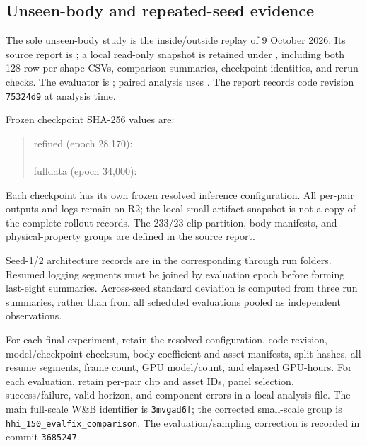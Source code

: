 \documentclass[11pt]{article}
\begin{document}
\subsection{Unseen-body and repeated-seed evidence}
The sole unseen-body study is the inside/outside replay of 9 October 2026.
Its source report is ;
a local read-only snapshot is retained under
, including both 128-row
per-shape CSVs, comparison summaries, checkpoint identities, and rerun checks.
The evaluator is ;
paired analysis uses .
The report records code revision \texttt{75324d9} at analysis time.

Frozen checkpoint SHA-256 values are:
\begin{quote}\footnotesize\ttfamily
refined (epoch 28,170):\\
\\
fulldata (epoch 34,000):\\
\end{quote}
Each checkpoint has its own frozen resolved inference configuration.
All per-pair outputs and logs remain on R2; the local small-artifact snapshot
is not a copy of the complete rollout records. The 233/23 clip partition,
body manifests, and physical-property groups are defined in the source report.

Seed-1/2 architecture records are in the corresponding
 through
 run folders. Resumed logging segments
must be joined by evaluation epoch before forming last-eight summaries.
Across-seed standard deviation is computed from three run summaries, rather
than from all scheduled evaluations pooled as independent observations.

For each final experiment, retain the resolved configuration, code revision,
model/checkpoint checksum, body coefficient and asset manifests, split hashes,
all resume segments, frame count, GPU model/count, and elapsed GPU-hours.
For each evaluation, retain per-pair clip and asset IDs, panel selection,
success/failure, valid horizon, and component errors in a local analysis file.
The main full-scale W\&B identifier is \texttt{3mvgad6f}; the corrected
small-scale group is \texttt{hhi\_150\_evalfix\_comparison}.
The evaluation/sampling correction is recorded in commit \texttt{3685247}.
\end{document}
